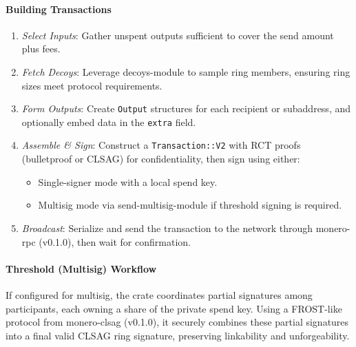 \documentclass[12pt,a4paper]{article}
\begin{document}
\paragraph{Building Transactions}
\begin{enumerate}
\item \emph{Select Inputs}: Gather unspent outputs sufficient to cover the send
  amount plus fees.
\item \emph{Fetch Decoys}: Leverage \gls{decoys-module} to sample ring members,
  ensuring ring sizes meet protocol requirements.
\item \emph{Form Outputs}: Create \texttt{Output} structures for each recipient
  or subaddress, and optionally embed data in the \texttt{extra} field.
\item \emph{Assemble \& Sign}: Construct a \texttt{Transaction::V2} with RCT
  proofs (bulletproof or CLSAG) for confidentiality, then sign using either:
  \begin{itemize}
    \item Single-signer mode with a local spend key.
    \item Multisig mode via \gls{send-multisig-module} if threshold signing is
      required.
  \end{itemize}
\item \emph{Broadcast}: Serialize and send the transaction to the network
  through \gls{monero-rpc (v0.1.0)}, then wait for confirmation.
\end{enumerate}

\paragraph{Threshold (Multisig) Workflow}
If configured for multisig, the crate coordinates partial signatures among
participants, each owning a share of the private spend key. Using a FROST-like
protocol from \gls{monero-clsag (v0.1.0)}, it securely combines these partial
signatures into a final valid CLSAG ring signature, preserving linkability and
unforgeability.
\end{document}
